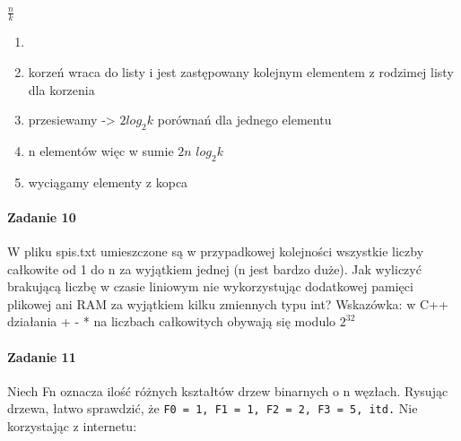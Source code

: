 \documentclass[18pt]{extarticle}
\begin{document}
 $\frac{n}{k}$
\begin{enumerate}
    \item {}
    \item korzeń wraca do listy i jest zastępowany kolejnym elementem z rodzimej listy dla korzenia
    \item przesiewamy -> $2log_2k$ porównań dla jednego elementu
    \item n elementów więc w sumie $2n$ $log_2k$
    \item wyciągamy elementy z kopca
\end{enumerate}


\paragraph{Zadanie 10} W pliku spis.txt umieszczone są w przypadkowej kolejności wszystkie liczby całkowite od 1 do n za wyjątkiem jednej (n jest bardzo duże). Jak wyliczyć brakującą liczbę w czasie liniowym nie wykorzystując dodatkowej pamięci plikowej ani RAM za wyjątkiem kilku zmiennych typu int? Wskazówka: w C++ działania + - * na liczbach całkowitych obywają się modulo $2^{32}$

\paragraph{Zadanie 11} Niech Fn oznacza ilość różnych kształtów drzew binarnych o n węzłach. Rysując drzewa, łatwo sprawdzić, że \texttt{F0 = 1, F1 = 1, F2 = 2, F3 = 5, itd.} Nie korzystając z internetu:
\end{document}
